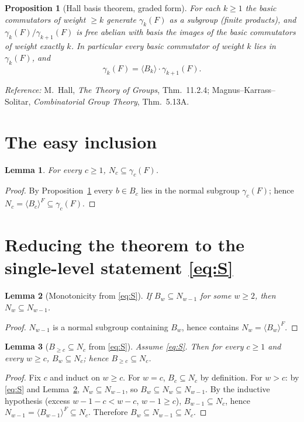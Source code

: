 \documentclass{amsart}
\newtheorem{lemma}{Lemma}
\newtheorem{proposition}{Proposition}
\theoremstyle{definition}
\theoremstyle{remark}
\begin{document}
\begin{proposition}[Hall basis theorem, graded form]\label{prop:hall}
For each $k\ge 1$ the basic commutators of weight $\ge k$ generate $\gamma_k(F)$
\emph{as a subgroup} \textup{(finite products)}, and $\gamma_k(F)/\gamma_{k+1}(F)$ is
free abelian with basis the images of the basic commutators of weight exactly $k$.
In particular every basic commutator of weight $k$ lies in $\gamma_k(F)$, and
\begin{equation}\label{eq:hall-decomp}
\gamma_k(F)=\langle B_k\rangle\cdot\gamma_{k+1}(F).
\end{equation}
\end{proposition}
\noindent\emph{Reference:} M.~Hall, \emph{The Theory of Groups}, Thm.~11.2.4;
Magnus--Karrass--Solitar, \emph{Combinatorial Group Theory}, Thm.~5.13A.

\section{The easy inclusion}\label{sec:easy}

\begin{lemma}\label{lem:easy}
For every $c\ge1$, $N_c\subseteq\gamma_c(F)$.
\end{lemma}
\begin{proof}
By Proposition~\ref{prop:hall} every $b\in B_c$ lies in the normal subgroup
$\gamma_c(F)$; hence $N_c=\langle B_c\rangle^{F}\subseteq\gamma_c(F)$.
\end{proof}

\section{Reducing the theorem to the single-level statement \eqref{eq:S}}
\label{sec:chain}

\begin{lemma}[Monotonicity from \eqref{eq:S}]\label{lem:mono}
If $B_w\subseteq N_{w-1}$ for some $w\ge2$, then $N_w\subseteq N_{w-1}$.
\end{lemma}
\begin{proof}
$N_{w-1}$ is a normal subgroup containing $B_w$, hence contains $N_w=\langle
B_w\rangle^{F}$.
\end{proof}

\begin{lemma}[$B_{\ge c}\subseteq N_c$ from \eqref{eq:S}]\label{lem:Bgec}
Assume \eqref{eq:S}. Then for every $c\ge1$ and every $w\ge c$, $B_w\subseteq N_c$;
hence $B_{\ge c}\subseteq N_c$.
\end{lemma}
\begin{proof}
Fix $c$ and induct on $w\ge c$. For $w=c$, $B_c\subseteq N_c$ by definition. For
$w>c$: by \eqref{eq:S} and Lemma~\ref{lem:mono}, $N_w\subseteq N_{w-1}$, so
$B_w\subseteq N_w\subseteq N_{w-1}$. By the inductive hypothesis (excess
$w-1-c<w-c$, $w-1\ge c$), $B_{w-1}\subseteq N_c$, hence
$N_{w-1}=\langle B_{w-1}\rangle^{F}\subseteq N_c$. Therefore $B_w\subseteq
N_{w-1}\subseteq N_c$.
\end{proof}
\end{document}
